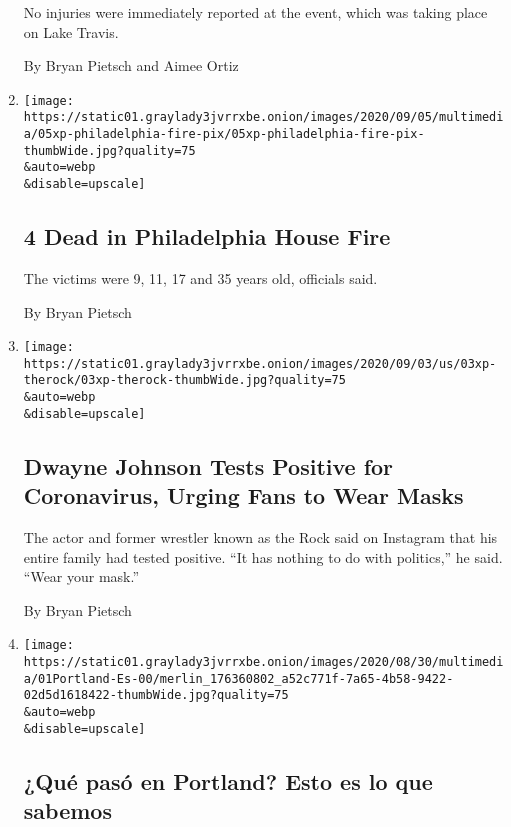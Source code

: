\begin{enumerate}
  No injuries were immediately reported at the event, which was taking
  place on Lake Travis.

  By Bryan Pietsch and Aimee Ortiz
\item
  \href{/2020/09/05/us/Philadelphia-row-house-fire-deaths.html}{}

  \texttt{[image: https://static01.graylady3jvrrxbe.onion/images/2020/09/05/multimedia/05xp-philadelphia-fire-pix/05xp-philadelphia-fire-pix-thumbWide.jpg?quality=75\\\&auto=webp\\\&disable=upscale]}

  \hypertarget{4-dead-in-philadelphia-house-fire}{%
  \subsection{4 Dead in Philadelphia House
  Fire}\label{4-dead-in-philadelphia-house-fire}}

  The victims were 9, 11, 17 and 35 years old, officials said.

  By Bryan Pietsch
\item
  \href{/2020/09/03/movies/the-rock-dwayne-johnson-covid.html}{}

  \texttt{[image: https://static01.graylady3jvrrxbe.onion/images/2020/09/03/us/03xp-therock/03xp-therock-thumbWide.jpg?quality=75\\\&auto=webp\\\&disable=upscale]}

  \hypertarget{dwayne-johnson-tests-positive-for-coronavirus-urging-fans-to-wear-masks}{%
  \subsection{Dwayne Johnson Tests Positive for Coronavirus, Urging Fans
  to Wear
  Masks}\label{dwayne-johnson-tests-positive-for-coronavirus-urging-fans-to-wear-masks}}

  The actor and former wrestler known as the Rock said on Instagram that
  his entire family had tested positive. ``It has nothing to do with
  politics,'' he said. ``Wear your mask.''

  By Bryan Pietsch
\item
  \href{/es/2020/09/01/espanol/estados-unidos/protestas-portland-tiroteo.html}{}

  \texttt{[image: https://static01.graylady3jvrrxbe.onion/images/2020/08/30/multimedia/01Portland-Es-00/merlin\_176360802\_a52c771f-7a65-4b58-9422-02d5d1618422-thumbWide.jpg?quality=75\\\&auto=webp\\\&disable=upscale]}

  \hypertarget{quuxe9-pasuxf3-en-portland-esto-es-lo-que-sabemos}{%
  \subsection{¿Qué pasó en Portland? Esto es lo que
  sabemos}\label{quuxe9-pasuxf3-en-portland-esto-es-lo-que-sabemos}}


\end{enumerate}
